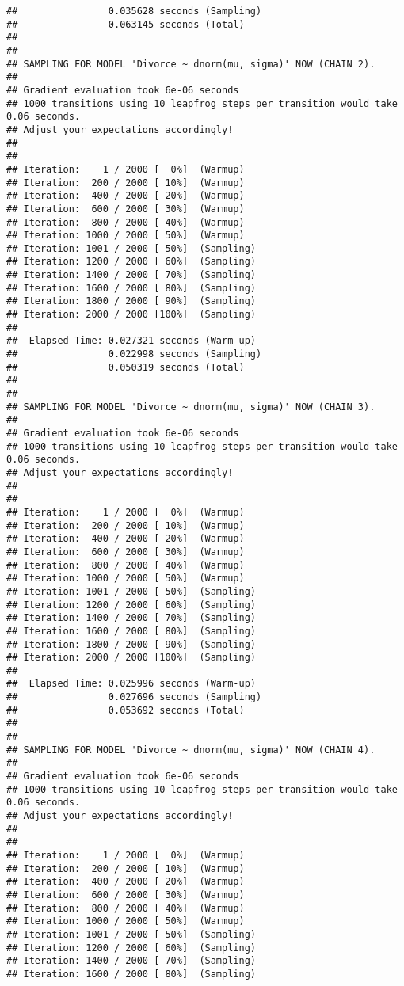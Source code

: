 \documentclass[]{article}
\begin{document}
\begin{verbatim}
##                0.035628 seconds (Sampling)
##                0.063145 seconds (Total)
## 
## 
## SAMPLING FOR MODEL 'Divorce ~ dnorm(mu, sigma)' NOW (CHAIN 2).
## 
## Gradient evaluation took 6e-06 seconds
## 1000 transitions using 10 leapfrog steps per transition would take 0.06 seconds.
## Adjust your expectations accordingly!
## 
## 
## Iteration:    1 / 2000 [  0%]  (Warmup)
## Iteration:  200 / 2000 [ 10%]  (Warmup)
## Iteration:  400 / 2000 [ 20%]  (Warmup)
## Iteration:  600 / 2000 [ 30%]  (Warmup)
## Iteration:  800 / 2000 [ 40%]  (Warmup)
## Iteration: 1000 / 2000 [ 50%]  (Warmup)
## Iteration: 1001 / 2000 [ 50%]  (Sampling)
## Iteration: 1200 / 2000 [ 60%]  (Sampling)
## Iteration: 1400 / 2000 [ 70%]  (Sampling)
## Iteration: 1600 / 2000 [ 80%]  (Sampling)
## Iteration: 1800 / 2000 [ 90%]  (Sampling)
## Iteration: 2000 / 2000 [100%]  (Sampling)
## 
##  Elapsed Time: 0.027321 seconds (Warm-up)
##                0.022998 seconds (Sampling)
##                0.050319 seconds (Total)
## 
## 
## SAMPLING FOR MODEL 'Divorce ~ dnorm(mu, sigma)' NOW (CHAIN 3).
## 
## Gradient evaluation took 6e-06 seconds
## 1000 transitions using 10 leapfrog steps per transition would take 0.06 seconds.
## Adjust your expectations accordingly!
## 
## 
## Iteration:    1 / 2000 [  0%]  (Warmup)
## Iteration:  200 / 2000 [ 10%]  (Warmup)
## Iteration:  400 / 2000 [ 20%]  (Warmup)
## Iteration:  600 / 2000 [ 30%]  (Warmup)
## Iteration:  800 / 2000 [ 40%]  (Warmup)
## Iteration: 1000 / 2000 [ 50%]  (Warmup)
## Iteration: 1001 / 2000 [ 50%]  (Sampling)
## Iteration: 1200 / 2000 [ 60%]  (Sampling)
## Iteration: 1400 / 2000 [ 70%]  (Sampling)
## Iteration: 1600 / 2000 [ 80%]  (Sampling)
## Iteration: 1800 / 2000 [ 90%]  (Sampling)
## Iteration: 2000 / 2000 [100%]  (Sampling)
## 
##  Elapsed Time: 0.025996 seconds (Warm-up)
##                0.027696 seconds (Sampling)
##                0.053692 seconds (Total)
## 
## 
## SAMPLING FOR MODEL 'Divorce ~ dnorm(mu, sigma)' NOW (CHAIN 4).
## 
## Gradient evaluation took 6e-06 seconds
## 1000 transitions using 10 leapfrog steps per transition would take 0.06 seconds.
## Adjust your expectations accordingly!
## 
## 
## Iteration:    1 / 2000 [  0%]  (Warmup)
## Iteration:  200 / 2000 [ 10%]  (Warmup)
## Iteration:  400 / 2000 [ 20%]  (Warmup)
## Iteration:  600 / 2000 [ 30%]  (Warmup)
## Iteration:  800 / 2000 [ 40%]  (Warmup)
## Iteration: 1000 / 2000 [ 50%]  (Warmup)
## Iteration: 1001 / 2000 [ 50%]  (Sampling)
## Iteration: 1200 / 2000 [ 60%]  (Sampling)
## Iteration: 1400 / 2000 [ 70%]  (Sampling)
## Iteration: 1600 / 2000 [ 80%]  (Sampling)

\end{verbatim}
\end{document}
